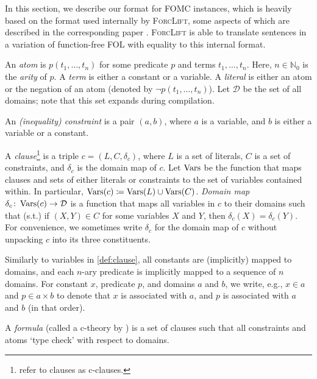 In this section, we describe our format for FOMC instances, which is heavily
based on the format used internally by \textsc{ForcLift}, some aspects of which
are described in the corresponding paper \citep{DBLP:conf/ijcai/BroeckTMDR11}.
\textsc{ForcLift} is able to translate sentences in a variation of function-free
FOL with equality to this internal format.

An \emph{atom} is $p(t_1, \dots, t_n)$ for some predicate $p$ and terms
$t_{1}, \dots, t_{n}$. Here, $n \in \mathbb{N}_0$ is the \emph{arity} of $p$. A
\emph{term} is either a constant or a variable. A \emph{literal} is either an
atom or the negation of an atom (denoted by $\neg p(t_1, \dots, t_n)$). Let
$\mathcal{D}$ be the set of all domains; note that this set expands during
compilation.

\begin{definition}[Constraint]\label{def:constraint}
  An \emph{(inequality) constraint} is a pair $(a, b)$, where $a$ is a variable,
  and $b$ is either a variable or a constant.
\end{definition}

\begin{definition}[Clause]\label{def:clause}
  A \emph{clause}\footnote{\citet{DBLP:conf/ijcai/BroeckTMDR11} refer to clauses
    as c-clauses.} is a triple $c = (L, C, \delta_c)$, where $L$ is a set of
  literals, $C$ is a set of constraints, and $\delta_c$ is the domain map of
  $c$. Let $\operatorname{Vars}$ be the function that maps clauses and sets of either literals
  or constraints to the set of variables contained within. In particular,
  $\operatorname{Vars}(c) \coloneqq \operatorname{Vars}(L) \cup \operatorname{Vars}(C)$. \emph{Domain map}
  $\delta_{c}\colon \operatorname{Vars}(c) \to \mathcal{D}$ is a function that maps all
  variables in $c$ to their domains such that (s.t.) if $(X, Y) \in C$ for some
  variables $X$ and $Y$, then $\delta_c(X) = \delta_c(Y)$. For convenience, we
  sometimes write $\delta_c$ for the domain map of $c$ without unpacking $c$
  into its three constituents.
\end{definition}

Similarly to variables in \cref{def:clause}, all constants are (implicitly)
mapped to domains, and each $n$-ary predicate is implicitly mapped to a sequence
of $n$ domains. For constant $x$, predicate $p$, and domains $a$ and $b$, we
write, e.g., $x \in a$ and $p \in a \times b$ to denote that $x$ is associated
with $a$, and $p$ is associated with $a$ and $b$ (in that order).

\begin{definition}[Formula]\label{def:formula}
  A \emph{formula} (called a c-theory by \citet{DBLP:conf/ijcai/BroeckTMDR11})
  is a set of clauses such that all constraints and atoms `type check' with
  respect to domains.
\end{definition}

